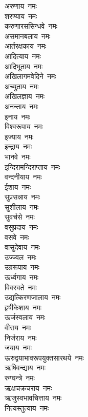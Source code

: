 \begin{multicols}{2}
    \begin{flushleft}
अरुणाय~नमः\\
शरण्याय~नमः\\
करुणारससिन्धवे~नमः\\
असमानबलाय~नमः\\
आर्तरक्षकाय~नमः\\
आदित्याय~नमः\\
आदिभूताय~नमः\\
अखिलागमवेदिने~नमः\\
अच्युताय~नमः\\
अखिलज्ञाय~नमः\hfill{}\\
अनन्ताय~नमः\\
इनाय~नमः\\
विश्वरूपाय~नमः\\
इज्याय~नमः\\
इन्द्राय~नमः\\
भानवे~नमः\\
इन्दिरामन्दिराप्ताय~नमः\\
वन्दनीयाय~नमः\\
ईशाय~नमः\\
सुप्रसन्नाय~नमः\hfill{}\\
सुशीलाय~नमः\\
सुवर्चसे~नमः\\
वसुप्रदाय~नमः\\
वसवे~नमः\\
वासुदेवाय~नमः\\
उज्ज्वल~नमः\\
उग्ररूपाय~नमः\\
ऊर्ध्वगाय~नमः\\
विवस्वते~नमः\\
उद्यत्किरणजालाय~नमः\hfill{}\\
हृषीकेशाय~नमः\\
ऊर्जस्वलाय~नमः\\
वीराय~नमः\\
निर्जराय~नमः\\
जयाय~नमः\\
ऊरुद्वयाभावरूपयुक्तसारथये~नमः\\
ऋषिवन्द्याय~नमः\\
रुग्घन्त्रे~नमः\\
ऋक्षचक्रचराय~नमः\\
ऋजुस्वभावचित्ताय~नमः\hfill{}\\
नित्यस्तुत्याय~नमः\\

\end{flushleft}
\end{multicols}
